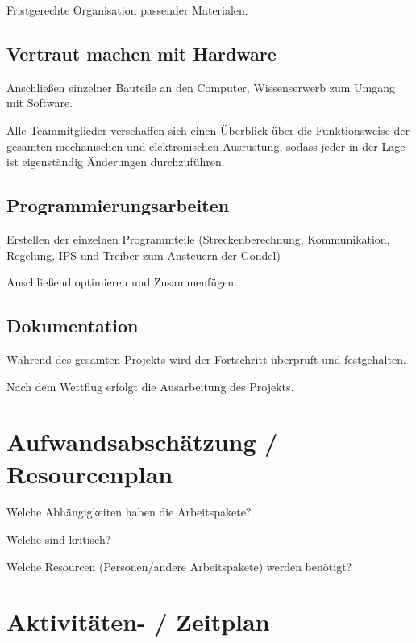 \documentclass[lang=ngerman,inputenc=utf8,fontsize=10pt]{ldvarticle}
\begin{document}
\begin{itemize}
Fristgerechte Organisation passender Materialen. 
 

\subsection*{Vertraut machen mit Hardware}

Anschließen einzelner Bauteile an den Computer, Wissenserwerb zum Umgang mit Software.


Alle Teammitglieder verschaffen sich einen Überblick über die Funktionsweise der gesamten mechanischen und elektronischen Ausrüstung, sodass jeder in der Lage ist eigenständig Änderungen durchzuführen.

\subsection*{Programmierungsarbeiten}

Erstellen der einzelnen Programmteile (Streckenberechnung, Kommunikation, Regelung, IPS und Treiber zum Ansteuern der Gondel)

Anschließend optimieren und Zusammenfügen.



\subsection*{Dokumentation}
Während des gesamten Projekts wird der Fortschritt überprüft und festgehalten.

Nach dem Wettflug erfolgt die Ausarbeitung des Projekts.

\section{Aufwandsabschätzung / Resourcenplan}

Welche Abhängigkeiten haben die Arbeitspakete?

Welche sind kritisch?

Welche Resourcen (Personen/andere Arbeitspakete) werden benötigt?

\section{Aktivitäten- / Zeitplan}


\end{itemize}
\end{document}
